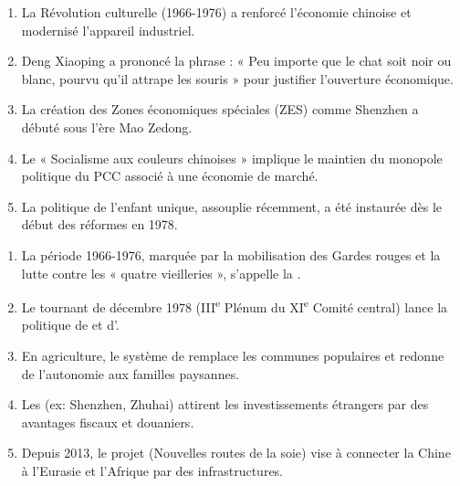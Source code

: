 \documentclass[11pt]{article}
\begin{document}
\begin{exercice}
\begin{enumerate}
    \item La Révolution culturelle (1966-1976) a renforcé l'économie chinoise et modernisé l'appareil industriel.
    \item Deng Xiaoping a prononcé la phrase : « Peu importe que le chat soit noir ou blanc, pourvu qu'il attrape les souris » pour justifier l'ouverture économique.
    \item La création des Zones économiques spéciales (ZES) comme Shenzhen a débuté sous l'ère Mao Zedong.
    \item Le « Socialisme aux couleurs chinoises » implique le maintien du monopole politique du PCC associé à une économie de marché.
    \item La politique de l'enfant unique, assouplie récemment, a été instaurée dès le début des réformes en 1978.
\end{enumerate}
\end{exercice}

\begin{exercice}
\begin{enumerate}
    \item La période 1966-1976, marquée par la mobilisation des Gardes rouges et la lutte contre les « quatre vieilleries », s'appelle la \underline{\hspace{5cm}}.
    \item Le tournant de décembre 1978 (III\textsuperscript{e} Plénum du XI\textsuperscript{e} Comité central) lance la politique de \underline{\hspace{5cm}} et d'\underline{\hspace{5cm}}.
    \item En agriculture, le système de \underline{\hspace{5cm}} remplace les communes populaires et redonne de l'autonomie aux familles paysannes.
    \item Les \underline{\hspace{5cm}} (ex: Shenzhen, Zhuhai) attirent les investissements étrangers par des avantages fiscaux et douaniers.
    \item Depuis 2013, le projet \underline{\hspace{5cm}} (Nouvelles routes de la soie) vise à connecter la Chine à l'Eurasie et l'Afrique par des infrastructures.
\end{enumerate}
\end{exercice}
\end{document}
